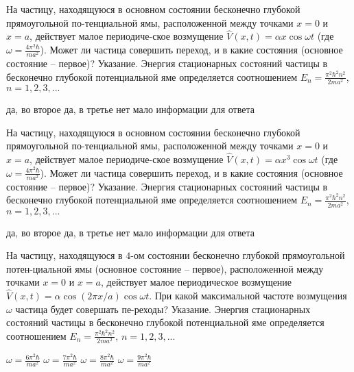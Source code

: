 \documentclass[11pt,a4paper]{exam}
\begin{document}
\begin{questions}
\question На частицу, находящуюся в основном состоянии бесконечно глубокой прямоугольной по-тенциальной ямы, расположенной между точками $x = 0$ и $x = a$, действует малое периодиче-ское возмущение $\hat V(x,t) = \alpha x\cos \omega t$ (где $\omega  = \frac{{4{\pi ^2}\hbar }}{{m{a^2}}}$). Может ли частица совершить переход, и в какие состояния (основное состояние – первое)? Указание. Энергия стационарных состояний частицы в бесконечно глубокой потенциальной яме определяется соотношением ${E_n} = \frac{{{\pi ^2}{\hbar ^2}{n^2}}}{{2m{a^2}}}$, $n = 1,2,3,...$
\begin{choices}
\choice да, во второе  
\choice да, в третье      
\choice нет      
\choice мало информации для ответа
\end{choices}

\question На частицу, находящуюся в основном состоянии бесконечно глубокой прямоугольной по-тенциальной ямы, расположенной между точками $x = 0$ и $x = a$, действует малое периодиче-ское возмущение $\hat V(x,t) = \alpha {x^3}\cos \omega t$ (где $\omega  = \frac{{4{\pi ^2}\hbar }}{{m{a^2}}}$). Может ли частица совершить переход, и в какие состояния (основное состояние – первое)? Указание. Энергия стационарных состояний частицы в бесконечно глубокой потенциальной яме определяется соотношением ${E_n} = \frac{{{\pi ^2}{\hbar ^2}{n^2}}}{{2m{a^2}}}$, $n = 1,2,3,...$
\begin{choices}
\choice да, во второе  
\choice да, в третье      
\choice нет      
\choice мало информации для ответа
\end{choices}

\question На частицу, находящуюся в $4$-ом состоянии бесконечно глубокой прямоугольной потен-циальной ямы (основное состояние – первое), расположенной между точками $x = 0$ и $x = a$, действует малое периодическое возмущение $\hat V(x,t) = \alpha \cos \left( {2\pi x/a} \right)\cos \omega t$. При какой максимальной частоте возмущения $\omega $ частица будет совершать пе-реходы? Указание. Энергия стационарных состояний частицы в бесконечно глубокой потенциальной яме определяется соотношением ${E_n} = \frac{{{\pi ^2}{\hbar ^2}{n^2}}}{{2m{a^2}}}$, $n = 1,2,3,...$
\begin{choices}
\choice $\omega  = \frac{{6{\pi ^2}\hbar }}{{m{a^2}}}$     
\choice $\omega  = \frac{{7{\pi ^2}\hbar }}{{m{a^2}}}$     
\choice $\omega  = \frac{{8{\pi ^2}\hbar }}{{m{a^2}}}$     
\choice $\omega  = \frac{{9{\pi ^2}\hbar }}{{m{a^2}}}$ 
\end{choices}


\end{questions}
\end{document}

